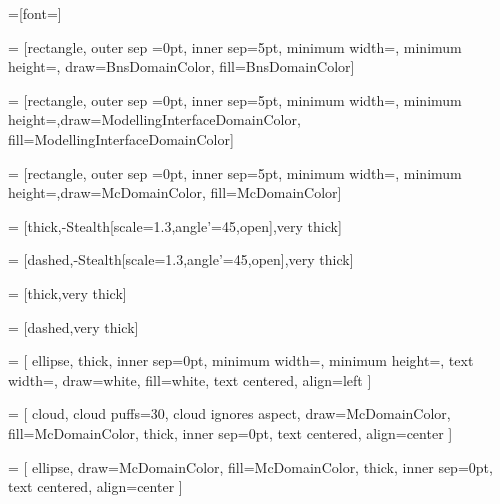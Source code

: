 \documentclass[tikz, table]{standalone}
\begin{document}


=[font=\Large]

 = [rectangle, outer sep =0pt, inner sep=5pt, minimum width=\MinNodeWidth, minimum height=\MinNodeHigth, draw=BnsDomainColor, fill=BnsDomainColor]

 = [rectangle, outer sep =0pt, inner sep=5pt, minimum width=\MinNodeWidth-3cm, minimum height=\MinNodeHigth,draw=ModellingInterfaceDomainColor, fill=ModellingInterfaceDomainColor]

 = [rectangle, outer sep =0pt, inner sep=5pt, minimum width=\MinNodeWidth, minimum height=\MinNodeHigth,draw=McDomainColor, fill=McDomainColor]



 = [thick,-{Stealth[scale=1.3,angle'=45,open]},very thick]

 = [dashed,-{Stealth[scale=1.3,angle'=45,open]},very thick]

 = [thick,very thick]

 = [dashed,very thick]

 = [
ellipse,
thick,
inner sep=0pt,
minimum width=\MinNodeWidth,
minimum height=\MinNodeHigth,
text width=\NodeTextWidth,
draw=white,
fill=white,
text centered, 
align=left
]

 = [
cloud, 
cloud puffs=30,
cloud ignores aspect,
draw=McDomainColor,
fill=McDomainColor,
thick,
inner sep=0pt,
text centered, 
align=center
]

 = [
ellipse,
draw=McDomainColor,
fill=McDomainColor,
thick,
inner sep=0pt,
text centered, 
align=center
]
\end{document}
